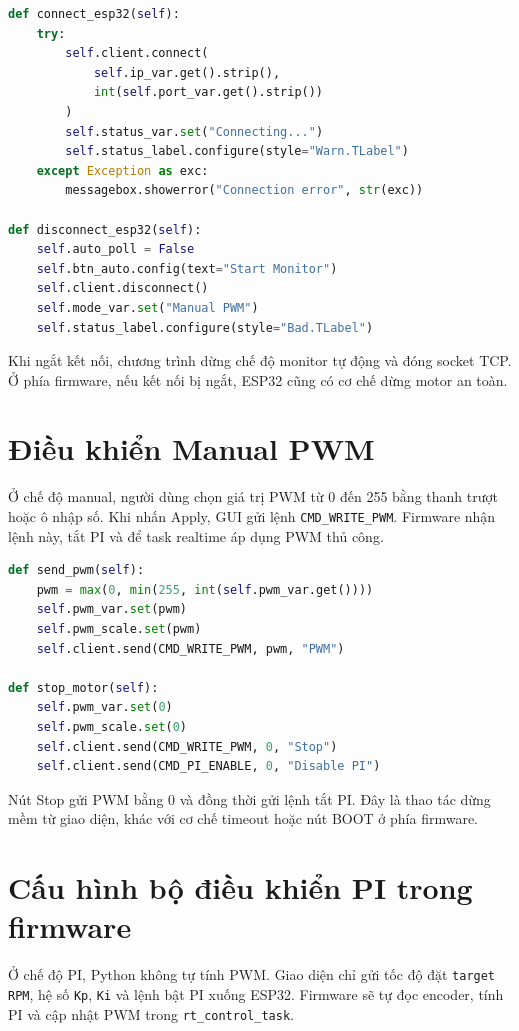 \documentclass[12pt,a4paper]{report}
\begin{document}
\begin{lstlisting}[language=Python]
def connect_esp32(self):
    try:
        self.client.connect(
            self.ip_var.get().strip(),
            int(self.port_var.get().strip())
        )
        self.status_var.set("Connecting...")
        self.status_label.configure(style="Warn.TLabel")
    except Exception as exc:
        messagebox.showerror("Connection error", str(exc))

def disconnect_esp32(self):
    self.auto_poll = False
    self.btn_auto.config(text="Start Monitor")
    self.client.disconnect()
    self.mode_var.set("Manual PWM")
    self.status_label.configure(style="Bad.TLabel")
\end{lstlisting}

Khi ngắt kết nối, chương trình dừng chế độ monitor tự động và đóng socket TCP. Ở phía firmware, nếu kết nối bị ngắt, ESP32 cũng có cơ chế dừng motor an toàn.

\section{Điều khiển Manual PWM}

Ở chế độ manual, người dùng chọn giá trị PWM từ 0 đến 255 bằng thanh trượt hoặc ô nhập số. Khi nhấn Apply, GUI gửi lệnh \texttt{CMD\_WRITE\_PWM}. Firmware nhận lệnh này, tắt PI và để task realtime áp dụng PWM thủ công.

\begin{lstlisting}[language=Python]
def send_pwm(self):
    pwm = max(0, min(255, int(self.pwm_var.get())))
    self.pwm_var.set(pwm)
    self.pwm_scale.set(pwm)
    self.client.send(CMD_WRITE_PWM, pwm, "PWM")

def stop_motor(self):
    self.pwm_var.set(0)
    self.pwm_scale.set(0)
    self.client.send(CMD_WRITE_PWM, 0, "Stop")
    self.client.send(CMD_PI_ENABLE, 0, "Disable PI")
\end{lstlisting}

Nút Stop gửi PWM bằng 0 và đồng thời gửi lệnh tắt PI. Đây là thao tác dừng mềm từ giao diện, khác với cơ chế timeout hoặc nút BOOT ở phía firmware.

\section{Cấu hình bộ điều khiển PI trong firmware}

Ở chế độ PI, Python không tự tính PWM. Giao diện chỉ gửi tốc độ đặt \texttt{target RPM}, hệ số \texttt{Kp}, \texttt{Ki} và lệnh bật PI xuống ESP32. Firmware sẽ tự đọc encoder, tính PI và cập nhật PWM trong \texttt{rt\_control\_task}.
\end{document}
